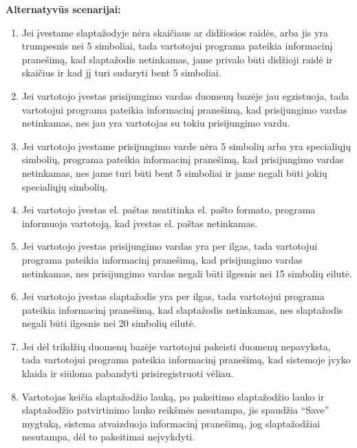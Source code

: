\documentclass{VUMIFPSkursinis}
\begin{document}
	\textbf{Alternatyvūs scenarijai:}
	\begin{enumerate}[itemsep=-2mm]
		\item Jei įvestame slaptažodyje nėra skaičiaus ar didžiosios raidės, arba jis yra trumpesnis nei 5 simboliai, tada vartotojui programa pateikia informacinį pranešimą, kad slaptažodis netinkamas, jame privalo būti didžioji raidė ir skaičius ir kad jį turi sudaryti bent 5 simboliai.
		\item Jei vartotojo įvestas prisijungimo vardas duomenų bazėje jau egzistuoja, tada vartotojui programa pateikia informacinį pranešimą, kad prisijungimo vardas netinkamas, nes jau yra vartotojas su tokiu prisijungimo vardu.
		\item Jei vartotojo įvestame prisijungimo varde nėra 5 simbolių arba yra specialiųjų simbolių, programa pateikia informacinį pranešimą, kad prisijungimo vardas netinkamas, nes jame turi būti bent 5 simboliai ir jame negali būti jokių specialiųjų simbolių.
		\item Jei vartotojo įvestas el. paštas neatitinka el. pašto formato, programa informuoja vartotoją, kad įvestas el. paštas netinkamas.
		\item Jei vartotojo įvestas prisijungimo vardas yra per ilgas, tada vartotojui programa pateikia informacinį pranešimą, kad prisijungimo vardas netinkamas, nes prisijungimo vardas negali būti ilgesnis nei 15 simbolių eilutė.
		\item Jei  vartotojo įvestas slaptažodis yra per ilgas, tada vartotojui programa pateikia informacinį pranešimą, kad slaptažodis netinkamas, nes slaptažodis negali būti ilgesnis nei 20 simbolių eilutė.
		\item Jei dėl trikdžių duomenų bazėje vartotojui pakeisti duomenų nepavyksta, tada vartotojui programa pateikia informacinį pranešimą, kad sistemoje įvyko klaida ir siūloma pabandyti prisiregistruoti vėliau.
		\item Vartotojas keičia slaptažodžio lauką, po pakeitimo slaptažodžio lauko ir slaptažodžio patvirtinimo lauko reikšmės nesutampa, jis spaudžia “Save” mygtuką, sistema atvaizduoja informacinį pranešimą, jog slaptažodžiai nesutampa, dėl to pakeitimai neįvykdyti.
	\end{enumerate} 
\end{document}

